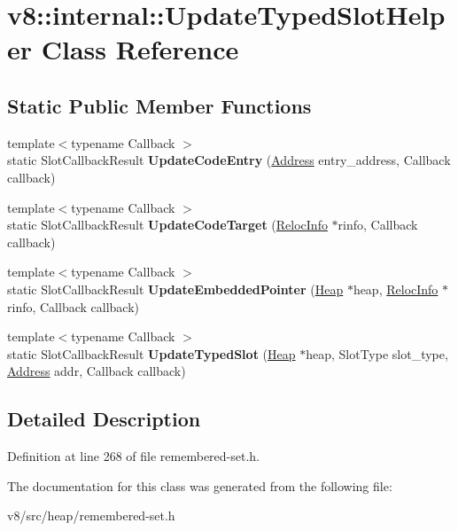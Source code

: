 \hypertarget{classv8_1_1internal_1_1UpdateTypedSlotHelper}{}\section{v8\+:\+:internal\+:\+:Update\+Typed\+Slot\+Helper Class Reference}
\label{classv8_1_1internal_1_1UpdateTypedSlotHelper}
\subsection*{Static Public Member Functions}
\begin{DoxyCompactItemize}
\item 
\mbox{\label{classv8_1_1internal_1_1UpdateTypedSlotHelper_a192a0b9ee4efc7956044e838a880b5a9}} 
{\footnotesize template$<$typename Callback $>$ }\\static Slot\+Callback\+Result {\bfseries Update\+Code\+Entry} (\mbox{\hyperlink{classuintptr__t}{Address}} entry\+\_\+address, Callback callback)
\item 
\mbox{\label{classv8_1_1internal_1_1UpdateTypedSlotHelper_a2ea858a10938579fd0092cb29708b780}} 
{\footnotesize template$<$typename Callback $>$ }\\static Slot\+Callback\+Result {\bfseries Update\+Code\+Target} (\mbox{\hyperlink{classv8_1_1internal_1_1RelocInfo}{Reloc\+Info}} $\ast$rinfo, Callback callback)
\item 
\mbox{\label{classv8_1_1internal_1_1UpdateTypedSlotHelper_ab2649ff645020a4f4ef32aa0fdb00e6c}} 
{\footnotesize template$<$typename Callback $>$ }\\static Slot\+Callback\+Result {\bfseries Update\+Embedded\+Pointer} (\mbox{\hyperlink{classv8_1_1internal_1_1Heap}{Heap}} $\ast$heap, \mbox{\hyperlink{classv8_1_1internal_1_1RelocInfo}{Reloc\+Info}} $\ast$rinfo, Callback callback)
\item 
\mbox{\label{classv8_1_1internal_1_1UpdateTypedSlotHelper_aa304c9e675936be4d489d03eef8cea06}} 
{\footnotesize template$<$typename Callback $>$ }\\static Slot\+Callback\+Result {\bfseries Update\+Typed\+Slot} (\mbox{\hyperlink{classv8_1_1internal_1_1Heap}{Heap}} $\ast$heap, Slot\+Type slot\+\_\+type, \mbox{\hyperlink{classuintptr__t}{Address}} addr, Callback callback)
\end{DoxyCompactItemize}


\subsection{Detailed Description}


Definition at line 268 of file remembered-\/set.\+h.



The documentation for this class was generated from the following file\+:\begin{DoxyCompactItemize}
\item 
v8/src/heap/remembered-\/set.\+h\end{DoxyCompactItemize}

